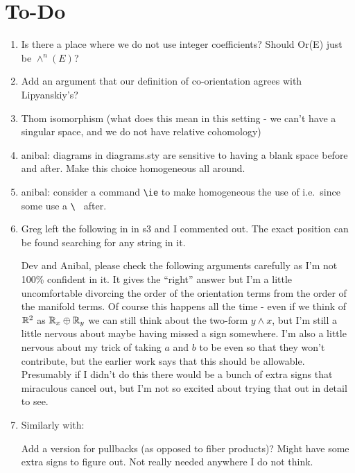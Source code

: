 
\section*{To-Do}

\begin{enumerate}
	\item Is there a place where we do not use integer coefficients? Should Or(E) just be $\wedge^n(E)$?

	\item Add an argument that our definition of co-orientation agrees with Lipyanskiy's?

	\item Thom isomorphism (what does this mean in this setting - we can't have a singular space, and we do not have relative cohomology)

	\item anibal: diagrams in diagrams.sty are sensitive to having a blank space before and after.
	Make this choice homogeneous all around.

	\item anibal: consider a command \verb|\ie| to make homogeneous the use of i.e.\ since some use a \verb|\ | after.

	\item Greg left the following in in s3 and I commented out.
	The exact position can be found searching for any string in it.

	Dev and Anibal, please check the following arguments carefully as I'm not 100\% confident in it.
	It gives the ``right'' answer but I'm a little uncomfortable divorcing the order of the orientation terms from the order of the manifold terms.
	Of course this happens all the time - even if we think of $\mathbb{R}^2$ as $\mathbb{R}_x \oplus \mathbb{R}_y$ we can still think about the two-form $y \wedge x$, but I'm still a little nervous about maybe having missed a sign somewhere.
	I'm also a little nervous about my trick of taking $a$ and $b$ to be even so that they won't contribute, but the earlier work says that this should be allowable.
	Presumably if I didn't do this there would be a bunch of extra signs that miraculous cancel out, but I'm not so excited about trying that out in detail to see.

	\item Similarly with:

	Add a version for pullbacks (as opposed to fiber products)? Might have some extra signs to figure out.
	Not really needed anywhere I do not think.


\end{enumerate}
